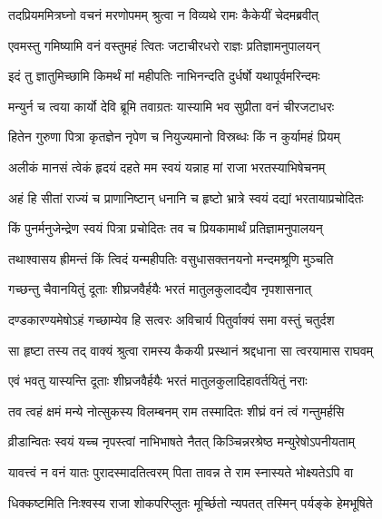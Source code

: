 
\twolineshloka
{तदप्रियममित्रघ्नो वचनं मरणोपमम्}
{श्रुत्वा न विव्यथे रामः कैकेयीं चेदमब्रवीत्} %

\twolineshloka
{एवमस्तु गमिष्यामि वनं वस्तुमहं त्वितः}
{जटाचीरधरो राज्ञः प्रतिज्ञामनुपालयन्} %

\twolineshloka
{इदं तु ज्ञातुमिच्छामि किमर्थं मां महीपतिः}
{नाभिनन्दति दुर्धर्षो यथापूर्वमरिन्दमः} %

\twolineshloka
{मन्युर्न च त्वया कार्यो देवि ब्रूमि तवाग्रतः}
{यास्यामि भव सुप्रीता वनं चीरजटाधरः} %

\twolineshloka
{हितेन गुरुणा पित्रा कृतज्ञेन नृपेण च}
{नियुज्यमानो विस्रब्धः किं न कुर्यामहं प्रियम्} %

\twolineshloka
{अलीकं मानसं त्वेकं हृदयं दहते मम}
{स्वयं यन्नाह मां राजा भरतस्याभिषेचनम्} %

\twolineshloka
{अहं हि सीतां राज्यं च प्राणानिष्टान् धनानि च}
{हृष्टो भ्रात्रे स्वयं दद्यां भरतायाप्रचोदितः} %

\twolineshloka
{किं पुनर्मनुजेन्द्रेण स्वयं पित्रा प्रचोदितः}
{तव च प्रियकामार्थं प्रतिज्ञामनुपालयन्} %

\twolineshloka
{तथाश्वासय ह्रीमन्तं किं त्विदं यन्महीपतिः}
{वसुधासक्तनयनो मन्दमश्रूणि मुञ्चति} %

\twolineshloka
{गच्छन्तु चैवानयितुं दूताः शीघ्रजवैर्हयैः}
{भरतं मातुलकुलादद्यैव नृपशासनात्} %

\twolineshloka
{दण्डकारण्यमेषोऽहं गच्छाम्येव हि सत्वरः}
{अविचार्य पितुर्वाक्यं समा वस्तुं चतुर्दश} %

\twolineshloka
{सा हृष्टा तस्य तद् वाक्यं श्रुत्वा रामस्य कैकयी}
{प्रस्थानं श्रद्दधाना सा त्वरयामास राघवम्} %

\twolineshloka
{एवं भवतु यास्यन्ति दूताः शीघ्रजवैर्हयैः}
{भरतं मातुलकुलादिहावर्तयितुं नराः} %

\twolineshloka
{तव त्वहं क्षमं मन्ये नोत्सुकस्य विलम्बनम्}
{राम तस्मादितः शीघ्रं वनं त्वं गन्तुमर्हसि} %

\twolineshloka
{व्रीडान्वितः स्वयं यच्च नृपस्त्वां नाभिभाषते}
{नैतत् किञ्चिन्नरश्रेष्ठ मन्युरेषोऽपनीयताम्} %

\twolineshloka
{यावत्त्वं न वनं यातः पुरादस्मादतित्वरम्}
{पिता तावन्न ते राम स्नास्यते भोक्ष्यतेऽपि वा} %

\twolineshloka
{धिक्कष्टमिति निःश्वस्य राजा शोकपरिप्लुतः}
{मूर्च्छितो न्यपतत् तस्मिन् पर्यङ्के हेमभूषिते} %

